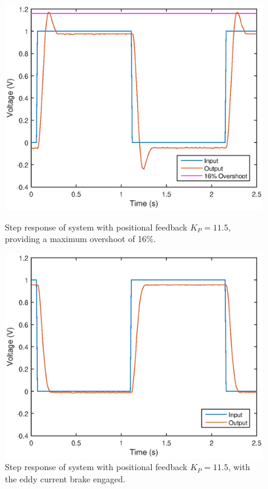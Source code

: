 \documentclass{article}
\begin{document}
\begin{figure}[H]
	\hspace{0.5cm}
	\begin{minipage}{7cm}
		\centering
		\includegraphics[scale=0.5]{fig6}
		\caption{Step response of system with positional feedback $K_P = 11.5$, providing a maximum overshoot of 16\%.}
	\end{minipage}
	\hspace{1cm}
	\begin{minipage}{7cm}
		\centering
		\includegraphics[scale=0.5]{fig7}
		\caption{Step response of system with positional feedback $K_P = 11.5$, with the eddy current brake engaged.}
	\end{minipage}
\end{figure}
\end{document}
